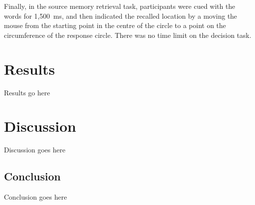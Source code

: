 \documentclass[10pt, a4paper, man, biblatex]{apa6}
\begin{document}
Finally, in the source memory retrieval task, participants were cued with the words for 1,500~ms, and then indicated the recalled location by a moving the mouse from the starting point in the centre of the circle to a point on the circumference of the response circle. There was no time limit on the decision task.

\section{Results}
Results go here

\section{Discussion}
Discussion goes here

\subsection{Conclusion}
Conclusion goes here


\printbibliography
\end{document}
